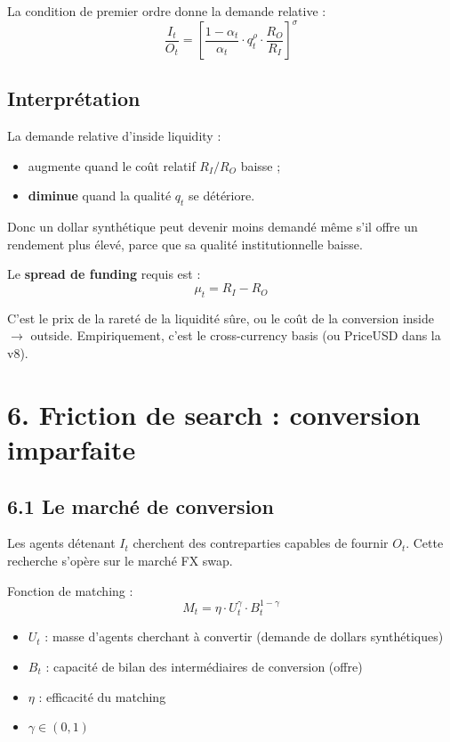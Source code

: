 La condition de premier ordre donne la demande relative :
\begin{equation}
\frac{I_t}{O_t} = \left[ \frac{1-\alpha_t}{\alpha_t} \cdot q_t^{\rho} \cdot \frac{R_O}{R_I} \right]^{\sigma}
\label{eq:demand-ratio}
\end{equation}

\subsection*{Interprétation}

La demande relative d'inside liquidity :
\begin{itemize}
  \item augmente quand le coût relatif $R_I/R_O$ baisse ;
  \item \textbf{diminue} quand la qualité $q_t$ se détériore.
\end{itemize}

Donc un dollar synthétique peut devenir moins demandé même s'il
offre un rendement plus élevé, parce que sa qualité institutionnelle
baisse.

Le \textbf{spread de funding} requis est :
\[
\mu_t = R_I - R_O
\]

C'est le prix de la rareté de la liquidité sûre, ou le coût de la
conversion inside $\to$ outside. Empiriquement, c'est le cross-currency
basis (ou PriceUSD dans la v8).

\section*{6. Friction de search : conversion imparfaite}

\subsection*{6.1 Le marché de conversion}

Les agents détenant $I_t$ cherchent des contreparties capables
de fournir $O_t$. Cette recherche s'opère sur le marché FX swap.

Fonction de matching :
\begin{equation}
M_t = \eta \cdot U_t^{\gamma} \cdot B_t^{1-\gamma}
\label{eq:matching}
\end{equation}

\begin{itemize}
  \item $U_t$ : masse d'agents cherchant à convertir (demande de dollars synthétiques)
  \item $B_t$ : capacité de bilan des intermédiaires de conversion (offre)
  \item $\eta$ : efficacité du matching
  \item $\gamma \in (0,1)$
\end{itemize}

